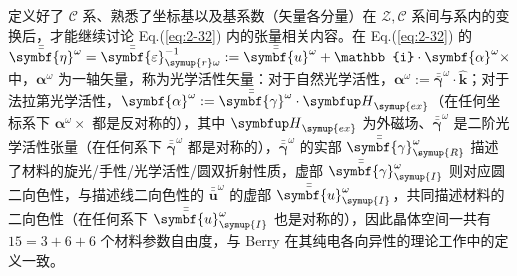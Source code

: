 定义好了 $\mathcal{C}$ 系、熟悉了坐标基以及基系数（矢量各分量）在 $\mathcal{Z,C}$ 系间与系内的变换后，才能继续讨论 Eq.(\ref{eq:2-32}) 内的张量相关内容。在 Eq.(\ref{eq:2-32}) 的 $\bar{\bar{\symbf{\eta}}}^\omega = \bar{\bar{\symbf{\varepsilon}}}^{-1}_{\symup{r}\omega} := \bar{\bar{\symbf{u}}}^\omega + \mathbb{i} \cdot {\symbf {\alpha}^\omega} \times$ 中，${\symbf {\alpha}^\omega}$ 为一轴矢量，称为光学活性矢量：对于自然光学活性，${\symbf {\alpha}^\omega} := \bar{\bar{\symbf{\gamma}}}^\omega \cdot \hat{\symbf k}$；对于法拉第光学活性，${\symbf {\alpha}^\omega} := \bar{\bar{\symbf{\gamma}}}^\omega \cdot {\symbfup H}_{\symup{ex}}$（在任何坐标系下 ${\symbf {\alpha}^\omega} \times$ 都是反对称的），其中 ${\symbfup H}_{\symup{ex}}$ 为外磁场、$\bar{\bar{\symbf{\gamma}}}^\omega$ 是二阶光学活性张量（在任何系下 $\bar{\bar{\symbf{\gamma}}}^\omega$ 都是对称的），$\bar{\bar{\symbf{\gamma}}}^\omega$ 的实部 $\bar{\bar{\symbf{\gamma}}}^\omega_{\symup{R}}$ 描述了材料的旋光/手性/光学活性/圆双折射性质，虚部 $\bar{\bar{\symbf{\gamma}}}^\omega_{\symup{I}}$ 则对应圆二向色性，与描述线二向色性的 $\bar{\bar{\symbf{u}}}^\omega$ 的虚部 $\bar{\bar{\symbf{u}}}_{\symup{I}}^\omega$，共同描述材料的二向色性（在任何系下 $\bar{\bar{\symbf{u}}}_{\symup{I}}^\omega$ 也是对称的\cite{XieQuanMianHuiYiWas}），因此晶体空间一共有 $15=3+6+6$ 个材料参数自由度，与 Berry 在其纯电各向异性的理论工作\cite{berryOpticalSingularitiesBirefringent2003}中的定义一致。

